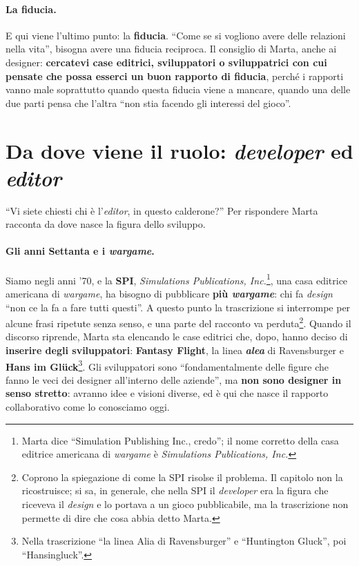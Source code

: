 \paragraph{La fiducia.} E qui viene l'ultimo punto: la \textbf{fiducia}. ``Come se si
vogliono avere delle relazioni nella vita'', bisogna avere una fiducia reciproca. Il
consiglio di Marta, anche ai designer: \textbf{cercatevi case editrici, sviluppatori o
sviluppatrici con cui pensate che possa esserci un buon rapporto di fiducia}, perché i
rapporti vanno male soprattutto quando questa fiducia viene a mancare, quando una delle
due parti pensa che l'altra ``non stia facendo gli interessi del gioco''.

\section{Da dove viene il ruolo: \emph{developer} ed \emph{editor}}
\label{a13:sec:storia}



``Vi siete chiesti chi è l'\emph{editor}, in questo calderone?'' Per rispondere Marta
racconta da dove nasce la figura dello sviluppo.

\paragraph{Gli anni Settanta e i \emph{wargame}.} Siamo negli anni '70, e la
\textbf{SPI}, \emph{Simulations Publications, Inc.}\footnote{Marta dice ``Simulation
Publishing Inc., credo''; il nome corretto della casa editrice americana di
\emph{wargame} è \emph{Simulations Publications, Inc.}}, una casa editrice americana di
\emph{wargame}, ha bisogno di pubblicare \textbf{più \emph{wargame}}: chi fa \emph{design}
``non ce la fa a fare tutti questi''. A questo punto la trascrizione si interrompe per
alcune frasi ripetute senza senso, e una parte del racconto va perduta\footnote{Coprono
la spiegazione di come la SPI risolse il problema. Il capitolo non la ricostruisce; si
sa, in generale, che nella SPI il \emph{developer} era la figura che riceveva il
\emph{design} e lo portava a un gioco pubblicabile, ma la trascrizione non permette di
dire che cosa abbia detto Marta.}. Quando il discorso riprende, Marta sta elencando le
case editrici che, dopo, hanno deciso di \textbf{inserire degli sviluppatori}:
\textbf{Fantasy Flight}, la linea \textbf{\emph{alea}} di Ravensburger e \textbf{Hans im
Glück}\footnote{Nella trascrizione ``la linea Alia di Ravensburger'' e ``Huntington
Gluck'', poi ``Hansingluck''.}. Gli sviluppatori sono ``fondamentalmente delle figure che
fanno le veci dei designer all'interno delle aziende'', ma \textbf{non sono designer in
senso stretto}: avranno idee e visioni diverse, ed è qui che nasce il rapporto
collaborativo come lo conosciamo oggi.

